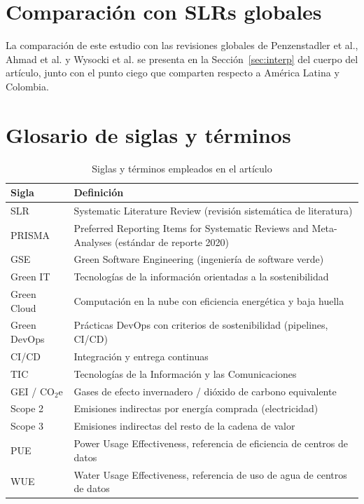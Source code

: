 \documentclass[conference]{IEEEtran}
\begin{document}
\section{Comparaci\'on con SLRs globales}\label{app:comparacion}
La comparaci\'on de este estudio con las revisiones globales de Penzenstadler et al., Ahmad et al. y Wysocki et al. se presenta en la Secci\'on~\ref{sec:interp} del cuerpo del art\'iculo, junto con el punto ciego que comparten respecto a Am\'erica Latina y Colombia.

\section{Glosario de siglas y t\'erminos}\label{app:glosario}
\begin{table}[H]
\centering
\caption{Siglas y t\'erminos empleados en el art\'iculo}
\label{tab:glosario}
\footnotesize
\begin{tabular}{@{}R{2.1cm} R{5.4cm}@{}}
\toprule
\textbf{Sigla} & \textbf{Definici\'on} \\
\midrule
SLR & Systematic Literature Review (revisi\'on sistem\'atica de literatura) \\
PRISMA & Preferred Reporting Items for Systematic Reviews and Meta-Analyses (est\'andar de reporte 2020) \\
GSE & Green Software Engineering (ingenier\'ia de software verde) \\
Green IT & Tecnolog\'ias de la informaci\'on orientadas a la sostenibilidad \\
Green Cloud & Computaci\'on en la nube con eficiencia energ\'etica y baja huella \\
Green DevOps & Pr\'acticas DevOps con criterios de sostenibilidad (pipelines, CI/CD) \\
CI/CD & Integraci\'on y entrega continuas \\
TIC & Tecnolog\'ias de la Informaci\'on y las Comunicaciones \\
GEI / CO$_2$e & Gases de efecto invernadero / di\'oxido de carbono equivalente \\
Scope 2 & Emisiones indirectas por energ\'ia comprada (electricidad) \\
Scope 3 & Emisiones indirectas del resto de la cadena de valor \\
PUE & Power Usage Effectiveness, referencia de eficiencia de centros de datos \\
WUE & Water Usage Effectiveness, referencia de uso de agua de centros de datos \\

\end{tabular}
\end{table}
\end{document}
